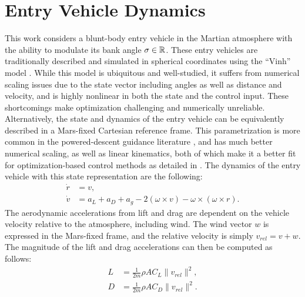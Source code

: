 \section{Entry Vehicle Dynamics}\label{section3}
This work considers a blunt-body entry vehicle in the Martian atmosphere with the ability to modulate its bank angle $\sigma \in \mathbb{R}{}$. These entry vehicles are traditionally described and simulated in spherical coordinates using the “Vinh” model \cite{busemann1976,vinh1980,vinh2000,wang2018,wang2019a,lu2014a,gallais2007}. While this model is ubiquitous and well-studied, it suffers from numerical scaling issues due to the state vector including angles as well as distance and velocity, and is highly nonlinear in both the state and the control input. These shortcomings make optimization challenging and numerically unreliable. Alternatively, the state and dynamics of the entry vehicle can be equivalently described in a Mars-fixed Cartesian reference frame. This parametrization is more common in the powered-descent guidance literature \cite{blackmore2012, acikmese2007, acikmese2013}, and has much better numerical scaling, as well as linear kinematics, both of which make it a better fit for optimization-based control methods as detailed in \cite{tracy2022}. The dynamics of the entry vehicle with this state representation are the following:
\begin{align}
    \dot{r} &= v, \\ 
    \dot{v} &= a_L + a_D + a_g - 2 (\omega \times v) - \omega \times (\omega \times r).
\end{align}
The aerodynamic accelerations from lift and drag are dependent on the vehicle velocity relative to the atmosphere, including wind. The wind vector $w$ is expressed in the Mars-fixed frame, and the relative velocity is simply $v_{rel} = v + w$. The magnitude of the lift and drag accelerations can then be computed as follows:
\begin{align}
    L &= \frac{1}{2m} \rho A C_L \|v_{rel}\|^2, \\ 
    D &= \frac{1}{2m} \rho A C_D \|v_{rel}\|^2.
\end{align}
